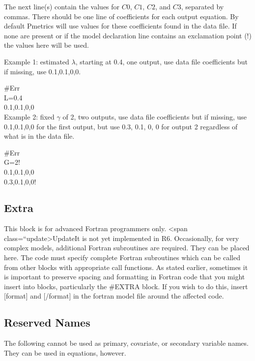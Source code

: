 \documentclass[
]{book}
\begin{document}
The next line(s) contain the values for \(C0\), \(C1\), \(C2\), and \(C3\),
separated by commas. There should be one line of coefficients for each
output equation. By default Pmetrics will use values for these
coefficients found in the data file. If none are present or if the model
declaration line contains an exclamation point (!) the values here will
be used.

Example 1: estimated \(\lambda\), starting at 0.4, one output, use data file
coefficients but if missing, use 0.1,0.1,0,0.

\#Err\\
L=0.4\\
0.1,0.1,0,0\\

Example 2: fixed \(\gamma\) of 2, two outputs, use data file coefficients but
if missing, use 0.1,0.1,0,0 for the first output, but use 0.3, 0.1, 0, 0
for output 2 regardless of what is in the data file.

\#Err\\
G=2!\\
0.1,0.1,0,0\\
0.3,0.1,0,0!\\

\hypertarget{extra}{%
\subsection{Extra}\label{extra}}

This block is for advanced Fortran programmers only.
\textless span class=``update\textgreater UpdateIt is not yet implemented in R6.
Occasionally, for very complex models, additional Fortran subroutines are required. They can be placed here. The code must specify complete Fortran subroutines
which can be called from other blocks with appropriate call functions.
As stated earlier, sometimes it is important to preserve spacing and
formatting in Fortran code that you might insert into blocks,
particularly the \#EXTRA block. If you wish to do this, insert {[}format{]} and {[}/format{]} in the fortran model file around the affected code.

\hypertarget{reserved}{%
\subsection{Reserved Names}\label{reserved}}

The following cannot be used as primary, covariate, or secondary
variable names. They can be used in equations, however.
\end{document}
